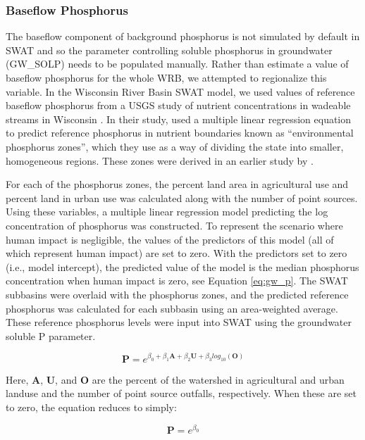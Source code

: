 \subsubsection{Baseflow Phosphorus} \label{sec:gwp}
	The baseflow component of background phosphorus is not simulated by default in SWAT and so the parameter controlling soluble phosphorus in groundwater (GW\_SOLP) needs to be populated manually. Rather than estimate a value of baseflow phosphorus for the whole WRB, we attempted to regionalize this variable. In the Wisconsin River Basin SWAT model, we used values of reference baseflow phosphorus from a USGS study of nutrient concentrations in wadeable streams in Wisconsin \citep{robertson_wadeable_2006}. In their study, \citet{robertson_wadeable_2006} used a multiple linear regression equation to predict reference phosphorus in nutrient boundaries known as ``environmental phosphorus zones'', which they use as a way of dividing the state into smaller, homogeneous regions. These zones were derived in an earlier study by \citet{robertson_phosphoruszones_2006}.

	
	For each of the phosphorus zones, the percent land area in agricultural use and percent land in urban use was calculated along with the number of point sources. Using these variables, a multiple linear regression model predicting the log concentration of phosphorus was constructed. To represent the scenario where human impact is negligible, the values of the predictors of this model (all of which represent human impact) are set to zero. With the predictors set to zero (i.e., model intercept), the predicted value of the model is the median phosphorus concentration when human impact is zero, see Equation \ref{eq:gw_p}. The SWAT subbasins were overlaid with the phosphorus zones, and the predicted reference phosphorus was calculated for each subbasin using an area-weighted average. These reference phosphorus levels were input into SWAT using the groundwater soluble P parameter.
	
	
	\begin{equation}
	\bm{P} = e^{\beta_0 + \beta_1 \bm{A} + \beta_2 \bm{U} + \beta_3 log_{10}(\bm{O})}
	\label{eq:gw_p}
	\end{equation}
		
	Here, $\bm{A}$, $\bm{U}$, and $\bm{O}$ are the percent of the watershed in agricultural and urban landuse and the number of point source outfalls, respectively. When these are set to zero, the equation reduces to simply:
	
	\begin{equation}
	\bm{P} = e^{\beta_0}
	\end{equation}
	
